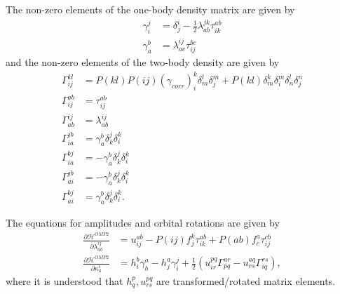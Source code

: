 \documentclass[10pt,a4paper]{article}
\begin{document}
The non-zero elements of the one-body density matrix are given by 
\begin{align}
\gamma_i^j &= \delta^i_j - \frac{1}{2} \lambda^{jk}_{ab} \tau^{ab}_{ik} \\
\gamma_a^b &= \lambda^{ij}_{ac}\tau^{bc}_{ij}
\end{align}
and the non-zero elements of the two-body density are given by 
\begin{align}
\Gamma^{kl}_{ij} &= P(kl)P(ij) (\gamma_{corr})_i^k \delta^l_m \delta^m_j + P(kl)\delta^k_m\delta^m_i\delta^l_n\delta^n_j \\
\Gamma^{ab}_{ij} &= \tau^{ab}_{ij} \\
\Gamma^{ij}_{ab} &= \lambda^{ij}_{ab} \\
\Gamma^{jb}_{ia} &= \gamma^b_a \delta^j_k\delta^k_i \\
\Gamma^{bj}_{ia} &= -\gamma^b_a \delta^j_k\delta^k_i \\
\Gamma^{jb}_{ai} &= -\gamma^b_a \delta^j_k\delta^k_i \\
\Gamma^{bj}_{ai} &= \gamma^b_a \delta^j_k\delta^k_i. 
\end{align}

The equations for amplitudes and orbital rotations are given by 
\begin{align}
\frac{\partial \mathcal{H}^{OMP2}}{\partial \lambda^{ij}_{ab}} &= u^{ab}_{ij} - P(ij)f^k_j \tau^{ab}_{ik} + P(ab)f^a_c \tau^{cb}_{ij} \\
\frac{\partial \mathcal{H}^{OMP2}}{\partial \kappa^i_a} &= h^b_i \gamma^a_b - h^a_j \gamma^j_i + \frac{1}{2} \left( u^{pq}_{ir}\Gamma^{ar}_{pq}-u^{aq}_{rs}\Gamma^{rs}_{iq} \right),
\end{align}
where it is understood that $h^p_q, u^{pq}_{rs}$ are transformed/rotated matrix elements.
\end{document}
